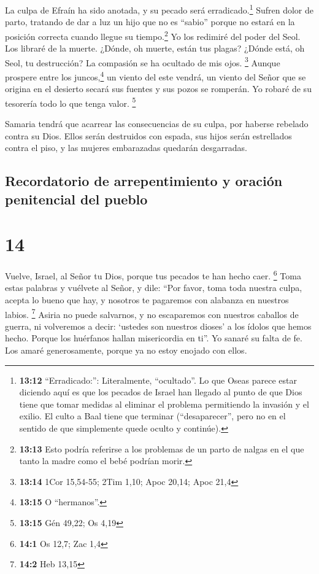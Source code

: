  La culpa de Efraín ha sido anotada, y su pecado será
erradicado.\footnote{\textbf{13:12} ``Erradicado:'': Literalmente,
  ``ocultado''. Lo que Oseas parece estar diciendo aquí es que los
  pecados de Israel han llegado al punto de que Dios tiene que tomar
  medidas al eliminar el problema permitiendo la invasión y el exilio.
  El culto a Baal tiene que terminar (``desaparecer'', pero no en el
  sentido de que simplemente quede oculto y continúe).} 
Sufren dolor de parto, tratando de dar a luz un hijo que no es ``sabio''
porque no estará en la posición correcta cuando llegue su
tiempo.\footnote{\textbf{13:13} Esto podría referirse a los problemas de
  un parto de nalgas en el que tanto la madre como el bebé podrían
  morir.}  Yo los redimiré del poder del Seol. Los
libraré de la muerte. ¿Dónde, oh muerte, están tus plagas? ¿Dónde está,
oh Seol, tu destrucción? La compasión se ha ocultado de mis ojos.
\footnote{\textbf{13:14} 1Cor 15,54-55; 2Tim 1,10; Apoc 20,14; Apoc 21,4}
 Aunque prospere entre los juncos,\footnote{\textbf{13:15}
  O ``hermanos''.} un viento del este vendrá, un viento del Señor que se
origina en el desierto secará sus fuentes y sus pozos se romperán. Yo
robaré de su tesorería todo lo que tenga valor. \footnote{\textbf{13:15}
  Gén 49,22; Os 4,19}

 Samaria tendrá que acarrear las consecuencias de su
culpa, por haberse rebelado contra su Dios. Ellos serán destruidos con
espada, sus hijos serán estrellados contra el piso, y las mujeres
embarazadas quedarán desgarradas.

\hypertarget{recordatorio-de-arrepentimiento-y-oraciuxf3n-penitencial-del-pueblo}{%
\subsection{Recordatorio de arrepentimiento y oración penitencial del
pueblo}\label{recordatorio-de-arrepentimiento-y-oraciuxf3n-penitencial-del-pueblo}}

\hypertarget{section-13}{%
\section{14}\label{section-13}}

 Vuelve, Israel, al Señor tu Dios, porque tus pecados te
han hecho caer. \footnote{\textbf{14:1} Os 12,7; Zac 1,4} 
Toma estas palabras y vuélvete al Señor, y dile: ``Por favor, toma toda
nuestra culpa, acepta lo bueno que hay, y nosotros te pagaremos con
alabanza en nuestros labios. \footnote{\textbf{14:2} Heb 13,15}
 Asiria no puede salvarnos, y no escaparemos con nuestros
caballos de guerra, ni volveremos a decir: `ustedes son nuestros dioses'
a los ídolos que hemos hecho. Porque los huérfanos hallan misericordia
en ti''.  Yo sanaré su falta de fe. Los amaré
generosamente, porque ya no estoy enojado con ellos.

